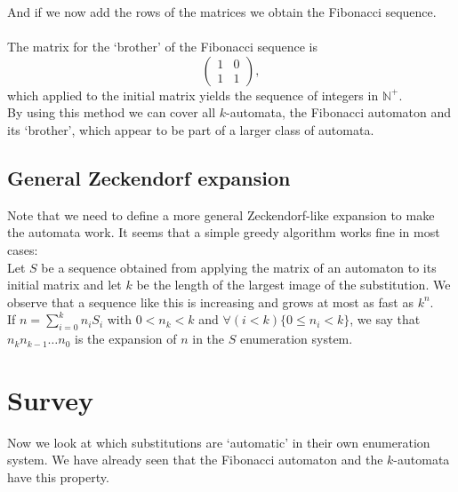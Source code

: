 \documentclass{article}
\begin{document}
And if we now add the rows of the matrices we obtain the Fibonacci sequence.\\
\\
The matrix for the `brother' of the Fibonacci sequence is
\begin{displaymath} \left( \begin{array}{cc}
1 & 0\\
1 & 1
\end{array} \right), \end{displaymath}
which applied to the initial matrix yields the sequence of integers in 
$\mathbb{N}^+$.\\
By using this method we can cover all $k$-automata, the Fibonacci automaton and
its `brother', which appear to be part of a larger class of automata.

\subsection{General Zeckendorf expansion}
Note that we need to define a more general Zeckendorf-like expansion to make
the automata work. It seems that a simple greedy algorithm works fine in most
cases:\\
Let $S$ be a sequence obtained from applying the matrix of an automaton to its
initial matrix and let $k$ be the length of the largest image of the 
substitution. We observe that a sequence like this is increasing and grows at 
most as fast as $k^n$.\\
If $n = \sum_{i = 0}^k n_i S_i$ with $0 < n_k < k$ and 
$\forall (i < k) \{0 \le n_i < k\}$, we say that $n_k n_{k - 1} \ldots n_0$ is 
the expansion of $n$ in the $S$ enumeration system.

\section{Survey}
Now we look at which substitutions are `automatic' in their own enumeration
system. We have already seen that the Fibonacci automaton and the $k$-automata
have this property.
\end{document}

